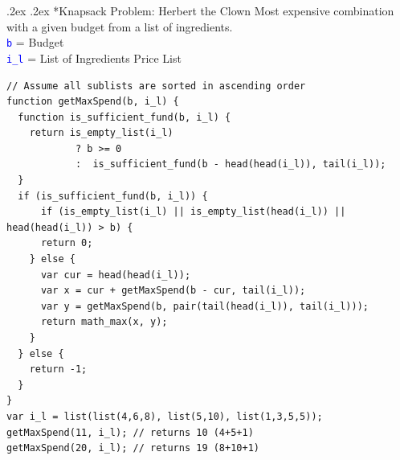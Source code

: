 \documentclass[10pt,portrait,a4paper]{article}
\makeatletter
\newcommand\codeblue[1]{\textcolor{blue}{\code{#1}}}
\def\code#1{\texttt{#1}}
\renewcommand{\subsection}{\@startsection{subsection}{1}{0mm}%
                                {.2ex}%
                                {.2ex}%
                                {\sffamily\bfseries}}
\makeatother
\begin{document}
\begin{multicols*}{4}
\subsection*{Knapsack Problem: Herbert the Clown}
Most expensive combination with a given budget from a list of ingredients.\\
\codeblue{b} = Budget\\
\codeblue{i\_l} = List of Ingredients Price List\\
\begin{minipage}{\columnwidth}
\begin{verbatim}
// Assume all sublists are sorted in ascending order
function getMaxSpend(b, i_l) {
  function is_sufficient_fund(b, i_l) {
    return is_empty_list(i_l)
            ? b >= 0
            :  is_sufficient_fund(b - head(head(i_l)), tail(i_l));
  }
  if (is_sufficient_fund(b, i_l)) {
      if (is_empty_list(i_l) || is_empty_list(head(i_l)) || head(head(i_l)) > b) {
      return 0;
    } else {
      var cur = head(head(i_l));
      var x = cur + getMaxSpend(b - cur, tail(i_l));
      var y = getMaxSpend(b, pair(tail(head(i_l)), tail(i_l)));
      return math_max(x, y);
    }
  } else {
    return -1;
  }
}
var i_l = list(list(4,6,8), list(5,10), list(1,3,5,5));
getMaxSpend(11, i_l); // returns 10 (4+5+1)
getMaxSpend(20, i_l); // returns 19 (8+10+1)

\end{verbatim}
\end{minipage}

\end{multicols*}
\end{document}

